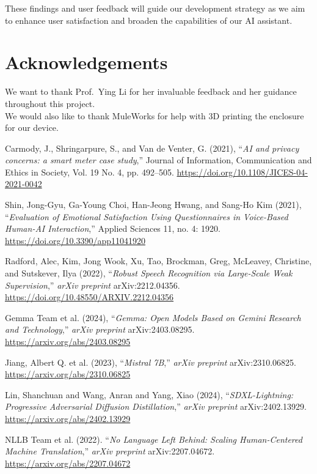 \documentclass[12pt]{article}
\begin{document}
These findings and user feedback will guide our development strategy as we aim to enhance user satisfaction and broaden the capabilities of our AI assistant.


\section*{Acknowledgements}
We want to thank Prof.~Ying Li for her invaluable feedback and her guidance throughout this project. \\
We would also like to thank MuleWorks for help with 3D printing the enclosure for our device.


\begin{thebibliography}{1}

Carmody, J., Shringarpure, S., and Van de Venter, G. (2021), ``\emph{AI and privacy concerns: a smart meter case study},'' Journal of Information, Communication and Ethics in Society, Vol. 19 No. 4, pp. 492--505. \href{https://doi.org/10.1108/JICES-04-2021-0042}{https://doi.org/10.1108/JICES-04-2021-0042}

Shin, Jong-Gyu, Ga-Young Choi, Han-Jeong Hwang, and Sang-Ho Kim (2021), ``\emph{Evaluation of Emotional Satisfaction Using Questionnaires in Voice-Based Human-AI Interaction},'' Applied Sciences 11, no. 4: 1920. \href{https://doi.org/10.3390/app11041920}{https://doi.org/10.3390/app11041920}

Radford, Alec, Kim, Jong Wook, Xu, Tao, Brockman, Greg, McLeavey, Christine, and Sutskever, Ilya (2022), ``\emph{Robust Speech Recognition via Large-Scale Weak Supervision},'' \emph{arXiv preprint} arXiv:2212.04356. \href{https://doi.org/10.48550/ARXIV.2212.04356}{https://doi.org/10.48550/ARXIV.2212.04356}

Gemma Team et al. (2024), ``\emph{Gemma: Open Models Based on Gemini Research and Technology},'' \emph{arXiv preprint} arXiv:2403.08295. \url{https://arxiv.org/abs/2403.08295}

Jiang, Albert Q. et al. (2023), ``\emph{Mistral 7B},'' \emph{arXiv preprint} arXiv:2310.06825. \url{https://arxiv.org/abs/2310.06825}

Lin, Shanchuan and Wang, Anran and Yang, Xiao (2024), ``\emph{SDXL-Lightning: Progressive Adversarial Diffusion Distillation},'' \emph{arXiv preprint} arXiv:2402.13929. \url{https://arxiv.org/abs/2402.13929}

NLLB Team et al. (2022). ``\emph{No Language Left Behind: Scaling Human-Centered Machine Translation},'' \emph{arXiv preprint} arXiv:2207.04672. \url{https://arxiv.org/abs/2207.04672}

\end{thebibliography}
\end{document}
